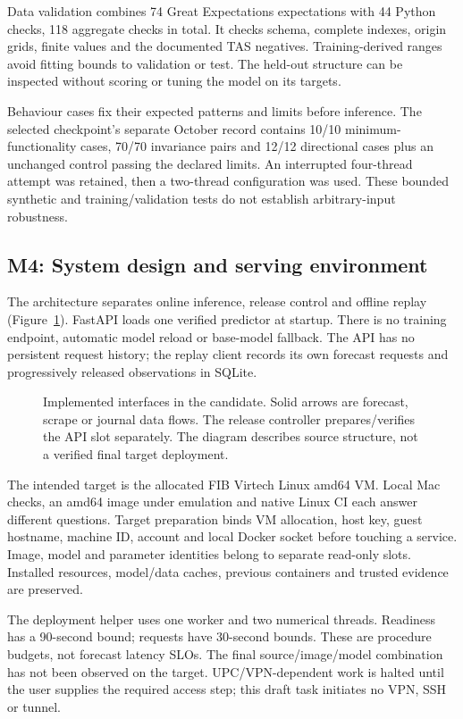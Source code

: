 \documentclass[a4paper,11pt]{article}
\begin{document}
Data validation combines 74 Great Expectations expectations with 44 Python checks,
118 aggregate checks in total. It checks schema, complete indexes, origin grids,
finite values and the documented TAS negatives. Training-derived ranges avoid
fitting bounds to validation or test. The held-out structure can be inspected
without scoring or tuning the model on its targets.

Behaviour cases fix their expected patterns and limits before inference. The
selected checkpoint's separate October record contains 10/10 minimum-functionality
cases, 70/70 invariance pairs and 12/12 directional cases plus an unchanged control
passing the declared limits. An interrupted four-thread attempt was retained,
then a two-thread configuration was used. These bounded synthetic and
training/validation tests do not establish arbitrary-input robustness.

\subsection{M4: System design and serving environment}

The architecture separates online inference, release control and offline replay
(Figure~\ref{fig:architecture}). FastAPI loads one verified predictor at startup.
There is no training endpoint, automatic model reload or base-model fallback.
The API has no persistent request history; the replay client records its own
forecast requests and progressively released observations in SQLite.

\begin{figure}[ht]\centering

\caption{Implemented interfaces in the candidate. Solid arrows are forecast,
scrape or journal data flows. The release controller prepares/verifies the API
slot separately. The diagram describes source structure, not a verified final
target deployment.}\label{fig:architecture}
\end{figure}

The intended target is the allocated FIB Virtech Linux amd64 VM. Local Mac checks,
an amd64 image under emulation and native Linux CI each answer different
questions. Target preparation binds VM allocation, host key, guest hostname,
machine ID, account and local Docker socket before touching a service. Image,
model and parameter identities belong to separate read-only slots. Installed
resources, model/data caches, previous containers and trusted evidence are
preserved.

The deployment helper uses one worker and two numerical threads. Readiness has a
90-second bound; requests have 30-second bounds. These are procedure budgets,
not forecast latency SLOs. The final source/image/model combination has not been
observed on the target. UPC/VPN-dependent work is halted until the user supplies
the required access step; this draft task initiates no VPN, SSH or tunnel.
\end{document}
